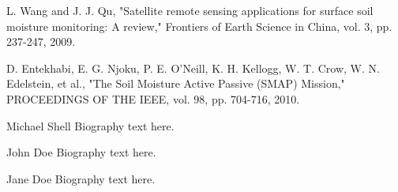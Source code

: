 \documentclass[draftcls,onecolumn]{IEEEtran}  %
\begin{document}
\begin{thebibliography}{1}
L. Wang and J. J. Qu, "Satellite remote sensing applications for surface soil moisture monitoring: A review," Frontiers of Earth Science in China, vol. 3, pp. 237-247, 2009.

D. Entekhabi, E. G. Njoku, P. E. O'Neill, K. H. Kellogg, W. T. Crow, W. N. Edelstein, et al., "The Soil Moisture Active Passive (SMAP) Mission," PROCEEDINGS OF THE IEEE, vol. 98, pp. 704-716, 2010.

\end{thebibliography}

% 

\begin{IEEEbiography}{Michael Shell}
Biography text here.
\end{IEEEbiography}

\begin{IEEEbiographynophoto}{John Doe}
Biography text here.
\end{IEEEbiographynophoto}


\begin{IEEEbiographynophoto}{Jane Doe}
Biography text here.
\end{IEEEbiographynophoto}






\end{document}
